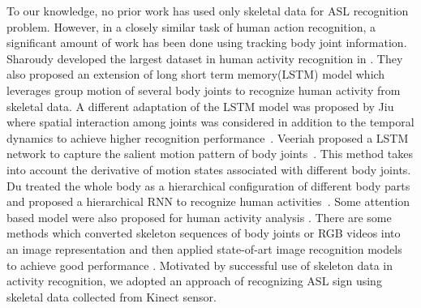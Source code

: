 \documentclass[10pt,twocolumn,letterpaper]{article}
\begin{document}
To our knowledge, no prior work has used only skeletal data for ASL recognition problem. However, in a closely similar task of human action recognition, a significant amount of work has been done using tracking body joint information. Sharoudy \etal developed the largest dataset in human activity recognition in \cite{7780484}. They also proposed an extension of long short term memory(LSTM) model which leverages group motion of several body joints to recognize human activity from skeletal data. A different adaptation of the LSTM model was proposed by Jiu \etal where spatial interaction among joints was considered in addition to the temporal dynamics to achieve higher recognition performance~\cite{8101019}. Veeriah \etal proposed a LSTM network to capture the salient motion pattern of body joints~\cite{7410817}. This method takes into account the derivative of motion states associated with different body joints. Du \etal treated the whole body as a hierarchical configuration of different body parts and proposed a hierarchical RNN to recognize human activities~\cite{7298714}. Some attention based model were also proposed for human activity analysis \cite{8226767, song2016end}. There are some methods which converted skeleton sequences of body joints or RGB videos into an image representation and then applied state-of-art image recognition models to achieve good performance \cite{DBLP:conf/cvpr/KeBASB17, DBLP:journals/corr/abs-1711-05941}.
Motivated by successful use of skeleton data in activity recognition, we adopted an approach of recognizing ASL sign using skeletal data collected from Kinect sensor.  
\end{document}
